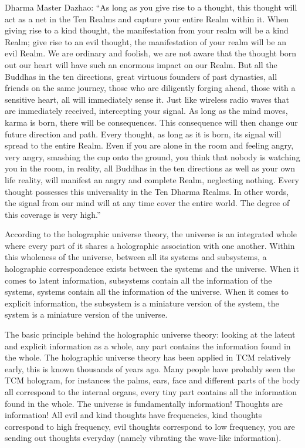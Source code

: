 \documentclass[
]{book}
\begin{document}
Dharma Master Dazhao: ``As long as you give rise to a thought, this thought will act as a net in the Ten Realms and capture your entire Realm within it. When giving rise to a kind thought, the manifestation from your realm will be a kind Realm; give rise to an evil thought, the manifestation of your realm will be an evil Realm. We are ordinary and foolish, we are not aware that the thought born out our heart will have such an enormous impact on our Realm. But all the Buddhas in the ten directions, great virtuous founders of past dynasties, all friends on the same journey, those who are diligently forging ahead, those with a sensitive heart, all will immediately sense it. Just like wireless radio waves that are immediately received, intercepting your signal. As long as the mind moves, karma is born, there will be consequences. This consequence will then change our future direction and path. Every thought, as long as it is born, its signal will spread to the entire Realm. Even if you are alone in the room and feeling angry, very angry, smashing the cup onto the ground, you think that nobody is watching you in the room, in reality, all Buddhas in the ten directions as well as your own life reality, will manifest an angry and complete Realm, neglecting nothing. Every thought possesses this universality in the Ten Dharma Realms. In other words, the signal from our mind will at any time cover the entire world. The degree of this coverage is very high.''

According to the holographic universe theory, the universe is an integrated whole where every part of it shares a holographic association with one another. Within this wholeness of the universe, between all its systems and subsystems, a holographic correspondence exists between the systems and the universe. When it comes to latent information, subsystems contain all the information of the systems, systems contain all the information of the universe. When it comes to explicit information, the subsystem is a miniature version of the system, the system is a miniature version of the universe.

The basic principle behind the holographic universe theory: looking at the latent and explicit information as a whole, any part contains the information found in the whole. The holographic universe theory has been applied in TCM relatively early, this is known thousands of years ago. Many people have probably seen the TCM hologram, for instances the palms, ears, face and different parts of the body all correspond to the internal organs, every tiny part contains all the information found in the whole. The universe is fundamentally information! Thoughts are information! All evil and kind thoughts have frequencies, kind thoughts correspond to high frequency, evil thoughts correspond to low frequency, you are sending out thoughts everyday (namely vibrating the wave-like information).
\end{document}
